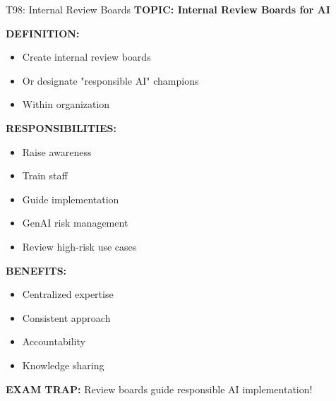 \documentclass[8pt]{beamer}
\begin{document}
	\begin{frame}{T98: Internal Review Boards}
		\fontsize{6.5}{7.5}\selectfont
		\textbf{TOPIC: Internal Review Boards for AI}
		
		\vspace{0.1cm}
		\textbf{DEFINITION:}
		\begin{itemize}
			\item Create internal review boards
			\item Or designate "responsible AI" champions
			\item Within organization
		\end{itemize}
		
		\vspace{0.1cm}
		\textbf{RESPONSIBILITIES:}
		\begin{itemize}
			\item Raise awareness
			\item Train staff
			\item Guide implementation
			\item GenAI risk management
			\item Review high-risk use cases
		\end{itemize}
		
		\vspace{0.1cm}
		\textbf{BENEFITS:}
		\begin{itemize}
			\item Centralized expertise
			\item Consistent approach
			\item Accountability
			\item Knowledge sharing
		\end{itemize}
		
		\textcolor{myred}{\textbf{EXAM TRAP:}} Review boards \textcolor{myblue}{guide responsible AI implementation}!
	\end{frame}
	
\end{document}
